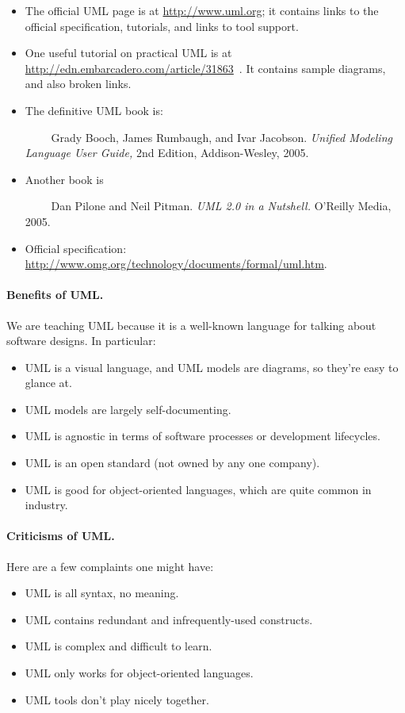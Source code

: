 \begin{itemize}
\item The official UML page is at \url{http://www.uml.org}; it contains 
links to the official specification, tutorials, and links to tool support.
\item One useful tutorial on practical UML is at \url{http://edn.embarcadero.com/article/31863}~\cite{uml:prac}. It contains sample diagrams, and also broken links.
\item The definitive UML book is:

$\qquad$ Grady Booch, James Rumbaugh, and Ivar Jacobson. \emph{Unified
Modeling Language User Guide,} 2nd Edition, Addison-Wesley, 2005.

\item Another book is 

$\qquad$ Dan Pilone and Neil Pitman. \emph{UML 2.0 in a Nutshell.} O'Reilly Media, 2005.

\item Official specification: \url{http://www.omg.org/technology/documents/formal/uml.htm}.
\end{itemize}


\paragraph{Benefits of UML.} We are teaching UML because it is a well-known
language for talking about software designs. In particular:

\begin{itemize}
\item UML is a visual language, and UML models are diagrams, so they're easy
to glance at.
\item UML models are largely self-documenting.
\item UML is agnostic in terms of software processes or development lifecycles.
\item UML is an open standard (not owned by any one company).
\item UML is good for object-oriented languages, which are quite common
in industry.
\end{itemize}

\paragraph{Criticisms of UML.} Here are a few complaints one might have:

\begin{itemize}
\item UML is all syntax, no meaning.
\item UML contains redundant and infrequently-used constructs.
\item UML is complex and difficult to learn.
\item UML only works for object-oriented languages.
\item UML tools don't play nicely together.
\end{itemize}

